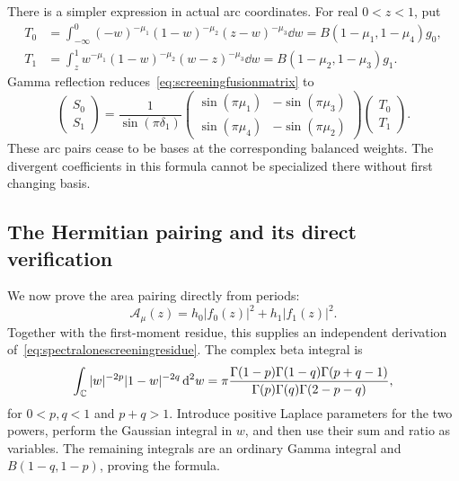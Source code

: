 There is a simpler expression in actual arc coordinates.
For real $0<z<1$, put
\begin{align*}
 T_0&=\int_{-\infty}^0
  (-w)^{-\mu_1}(1-w)^{-\mu_2}(z-w)^{-\mu_3}\dd w
       =B(1-\mu_1,1-\mu_4)g_0,\\
 T_1&=\int_z^1
  w^{-\mu_1}(1-w)^{-\mu_2}(w-z)^{-\mu_3}\dd w
       =B(1-\mu_2,1-\mu_3)g_1.
\end{align*}
Gamma reflection reduces~\eqref{eq:screeningfusionmatrix} to
\begin{equation}
 \boxed{\quad
 \begin{pmatrix}S_0\\S_1\end{pmatrix}
 =\frac1{\sin(\pi\delta_1)}
 \begin{pmatrix}
 \sin(\pi\mu_1)&-\sin(\pi\mu_3)\\
 \sin(\pi\mu_4)&-\sin(\pi\mu_2)
 \end{pmatrix}
 \begin{pmatrix}T_0\\T_1\end{pmatrix}.
 \quad}
 \label{eq:screeningsinefusion}
\end{equation}
These arc pairs cease to be bases at the corresponding
balanced weights. The divergent coefficients in this formula
cannot be specialized there without first changing basis.

\subsection{The Hermitian pairing and its direct verification}

We now prove the area pairing directly from periods:
\begin{equation}
 \boxed{\quad
 \mathcal A_\mu(z)=h_0|f_0(z)|^2+h_1|f_1(z)|^2.
 \quad}
 \label{eq:screeningareapairing}
\end{equation}
Together with the first-moment residue, this supplies an
independent derivation of~\eqref{eq:spectralonescreeningresidue}.
The complex beta integral is
\begin{equation}
 \int_{\mathbb C}|w|^{-2p}|1-w|^{-2q}\mathop{}\!\mathrm d^2w
 =\pi\frac{\Gamma(1-p)\Gamma(1-q)\Gamma(p+q-1)}
             {\Gamma(p)\Gamma(q)\Gamma(2-p-q)},
 \label{eq:complexbetaintegral}
\end{equation}
for $0<p,q<1$ and $p+q>1$. Introduce positive Laplace
parameters for the two powers, perform the Gaussian integral
in $w$, and then use their sum and ratio as variables. The
remaining integrals are an ordinary Gamma integral and
$B(1-q,1-p)$, proving the formula.

